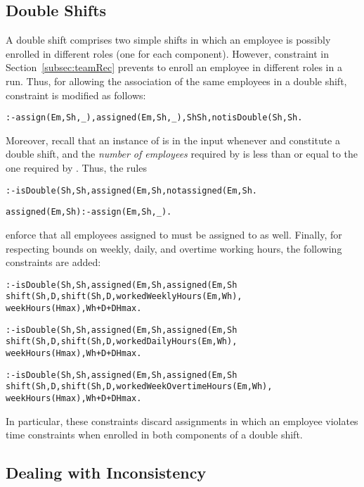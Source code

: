 \documentclass{tlp}
\begin{document}
\subsection{Double Shifts}\label{subsec:double}
A double shift comprises two simple shifts in which an employee is possibly enrolled in different roles (one for each component).
However, constraint \mytt{(*)} in Section~\ref{subsec:teamRec} prevents to enroll an employee in different roles in a run.
Thus, for allowing the association of the same employees in a double shift, constraint \mytt{(*)} is modified as follows:
\begin{alltt}\small
 :- assign(Em,Sh,_), assigned(Em,Sh,_), Sh  Sh, not isDouble(Sh,Sh.
\end{alltt}\normalsize
Moreover, recall that an instance of  
is in the input whenever  and  constitute a double shift, and
the {\em number of employees} required by  is less than or equal to the one
required by .
Thus, the rules
\begin{alltt}\small
 :- isDouble(Sh,Sh, assigned(Em,Sh, not assigned(Em,Sh.

 assigned(Em,Sh) :- assign(Em,Sh,_).
\end{alltt}\normalsize
enforce that all employees assigned to 
must be assigned to  as well.
Finally, for respecting bounds on weekly, daily, and overtime working hours, the following constraints are added:
\begin{alltt}\small
 :- isDouble(Sh,Sh, assigned(Em,Sh, assigned(Em,Sh
    shift(Sh,D, shift(Sh,D, workedWeeklyHours(Em,Wh),
    weekHours(Hmax), Wh + D + D   Hmax.

 :- isDouble(Sh,Sh, assigned(Em,Sh, assigned(Em,Sh
    shift(Sh,D, shift(Sh,D, workedDailyHours(Em,Wh),
    weekHours(Hmax), Wh + D + D   Hmax.

 :- isDouble(Sh,Sh, assigned(Em,Sh, assigned(Em,Sh
    shift(Sh,D, shift(Sh,D, workedWeekOvertimeHours(Em,Wh),
    weekHours(Hmax), Wh + D + D   Hmax.
\end{alltt}\normalsize
In particular, these constraints discard assignments in which an employee violates time constraints when enrolled in both components of a double shift.

\subsection{Dealing with Inconsistency}
\end{document}
